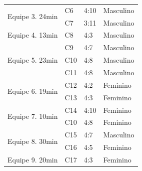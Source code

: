 \begin{quadro}[!h]
{\begin{footnotesize}
{\begin{tabular}{|l|l|l|l|}
            \multirow{2}{*}{Equipe 3. 24min}                & C6               & 4:10                         & Masculino \\ 
            \cline{2-4}
                                                                                        & C7               & 3:11                         & Masculino  \\ 
            \hline
            Equipe 4. 13min                                                 & C8               & 4:3                          & Masculino \\ 
            \hline
            \multirow{3}{*}{Equipe 5. 23min}                & C9               & 4:7                          & Masculino  \\ 
            \cline{2-4}
                                                                                    & C10              & 4:8                          & Masculino   \\ 
            \cline{2-4}
                                                                                    & C11              & 4:8                          & Masculino   \\ 
            \hline
            \multirow{2}{*}{Equipe 6. 19min}                & C12              & 4:2                          &  Feminino \\ 
            \cline{2-4}
                                                                                     & C13              & 4:3                          &  Feminino \\ 
            \hline
            \multirow{2}{*}{Equipe 7. 10min}                & C14              & 4:10                         &  Feminino \\ 
            \cline{2-4}
                                                                                        & C10              & 4:8                          &  Feminino \\ 
            \hline
            \multirow{2}{*}{Equipe 8. 30min}                & C15              & 4:7                          & Masculino \\ 
            \cline{2-4}
                                                                                        & C16              & 4:5                          &  Feminino \\ 
            \hline
            \multirow{2}{*}{Equipe 9. 20min}                & C17              & 4:3                            &  Feminino \\ 
            \cline{2-4}

\end{tabular}}
\end{footnotesize}}
\end{quadro}
